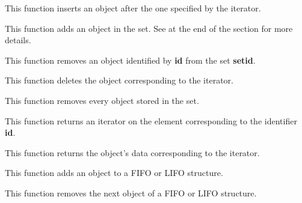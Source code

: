 This function inserts an object after the one specified by the iterator.


This function adds an object in the set. See at the end of the section
for more details.


This function removes an object identified by \textbf{id} from the
set \textbf{setid}.


This function deletes the object corresponding to the iterator.


This function removes every object stored in the set.


This function returns an iterator on the element corresponding to the
identifier \textbf{id}.


This function returns the object's data corresponding to the iterator.


This function adds an object to a FIFO or LIFO structure.


This function removes the next object of a FIFO or LIFO structure.



